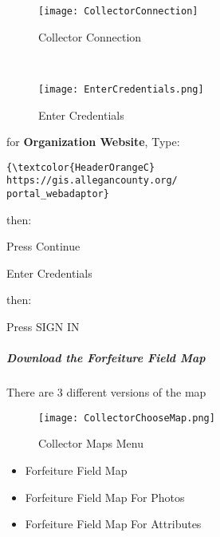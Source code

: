 \documentclass[class=book , crop=false, titlepage, twoside, multi={itemize, figure, verbatim}, float=false]{standalone}
\begin{document}
%
%
\begin{wrapfigure}{r}{0.5\textwidth}
\centering
\texttt{[image: CollectorConnection]}
\caption{Collector Connection}
\vspace{.25in}

\HRule \\[.4cm] %
\vspace{.25in}

\texttt{[image: EnterCredentials.png]}
\caption{Enter Credentials}
\end{wrapfigure}
for \textbf{Organization Website}, Type:
\vspace{.5in}

\begin{verbatim}
{\textcolor{HeaderOrangeC}
https://gis.allegancounty.org/
portal_webadaptor}

\end{verbatim}
\large then:
\vspace{.5in}

\noindent Press \Large Continue
\vspace{1.5in}

\noindent Enter Credentials
\vspace{.5in}

\noindent \large then:
\vspace{.5in}

\noindent Press \Large SIGN IN
\clearpage
%
%
%
\subparagraph[Download the Forfeiture Field Map]{Download the Forfeiture Field Map \texorpdfstring{\\}{}}
%
\noindent There are 3 different versions of the map
%
%
\begin{wrapfigure}{r}{0.5\textwidth}
\centering
\texttt{[image: CollectorChooseMap.png]}
\caption{Collector Maps Menu}
\end{wrapfigure}
\begin{itemize}
\item Forfeiture Field Map
\item Forfeiture Field Map For Photos
\item Forfeiture Field Map For Attributes
\end{itemize}

\vspace{.2in}
\end{document}
